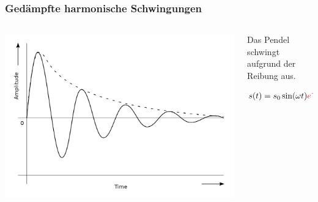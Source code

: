 \documentclass{beamer}
\begin{document}
\begin{frame}
\frametitle{Gedämpfte harmonische Schwingungen}


\begin{columns}[c]

\begin{column}{5cm}
\begin{center}
    \includegraphics[width=\textwidth]{Damped_sinewave.svg.png}
\end{center}
\end{column}

\begin{column}{5cm}
Das Pendel schwingt aufgrund der Reibung aus. 


\[
s(t) =  s_0 \sin (\omega t) \textcolor{red}{e^{-\delta t}}
\]
\end{column}


\end{columns}

\end{frame}



\end{document}
